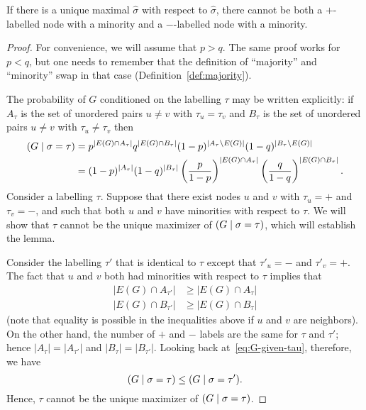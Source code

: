 \documentclass[EJP,final]{ejpecp}
\newcommand{\1}[1]{\mathbbm{1}_{\{#1\}}}
\let\Pr\relax
\DeclareMathOperator{\Pr}{Pr}
\begin{document}
\begin{lemma}\label{lem:MAP-minority}
If there is a unique maximal $\hat \sigma$
with respect to $\hat \sigma$, there cannot be both a $+$-labelled node
with a minority and a $-$-labelled node with a minority.
\end{lemma}

\begin{proof}
For convenience, we will assume that $p > q$. The same
proof works for $p < q$, but one needs to remember that the definition
of ``majority'' and ``minority'' swap in that case
(Definition~\ref{def:majority}).

The probability of $G$ conditioned on the labelling $\tau$
may be written explicitly: if $A_\tau$ is the set of unordered pairs
$u \ne v$ with $\tau_u = \tau_v$ and $B_\tau$ is the set of unordered pairs
$u \ne v$ with $\tau_u \ne \tau_v$ then
\begin{align}
 \Pr(G \mid \sigma = \tau)
 &= p^{|E(G) \cap A_\tau|}
   q^{|E(G) \cap B_\tau|}
   (1-p)^{|A_\tau \setminus E(G)|}
   (1-q)^{|B_\tau \setminus E(G)|} \notag \\
 &= (1-p)^{|A_\tau|} (1-q)^{|B_\tau|}
  \left(\frac{p}{1-p}\right)^{|E(G) \cap A_\tau|}
  \left(\frac{q}{1-q}\right)^{|E(G) \cap B_\tau|}.
  \label{eq:G-given-tau}
\end{align}
Consider a labelling $\tau$.
Suppose that there exist nodes $u$ and $v$ with $\tau_u = +$
and $\tau_v = -$, and such that both $u$ and $v$ have minorities with respect
to $\tau$. We will show that $\tau$ cannot be the unique
maximizer of $\Pr(G \mid \sigma = \tau)$, which will establish the lemma.

Consider the labelling $\tau'$ that is identical to $\tau$
except that $\tau'_u = -$ and $\tau'_v = +$. The fact that $u$ and $v$
both had minorities with respect to $\tau$ implies that
\begin{align*}
 |E(G) \cap A_{\tau'}| &\ge |E(G) \cap A_\tau| \\
 |E(G) \cap B_{\tau'}| &\ge |E(G) \cap B_\tau|
\end{align*}
(note that equality is possible in the inequalities above if
$u$ and $v$ are neighbors). On the other hand, the number of $+$
and $-$ labels are the same for $\tau$ and $\tau'$; hence
$|A_\tau| = |A_{\tau'}|$ and $|B_\tau| = |B_{\tau'}|$.
Looking back at~\eqref{eq:G-given-tau}, therefore, we have
\[
 \Pr(G \mid \sigma = \tau) \le \Pr(G \mid \sigma = \tau').
\]
Hence, $\tau$ cannot be the unique maximizer of $\Pr(G \mid \sigma = \tau)$.
\end{proof}
\end{document}

